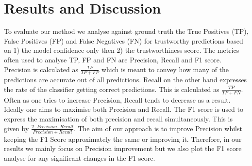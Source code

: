 \section{Results and Discussion} \label{sec:results}
To evaluate our method we analyse against ground truth the True Positives (TP), False Positives (FP) and False Negatives (FN) for trustworthy predictions based on 1) the model confidence only then 2) the trustworthiness score.  
%
The metrics often used to analyse TP, FP and FN are Precision, Recall and F1 score. Precision is calculated as $\frac{TP}{TP+FP}$  which is meant to convey how many of the predictions are accurate out of all predictions. Recall on the other hand expresses the rate of the classifier getting correct predictions. This is calculated as $\frac{TP}{TP+FN}$. Often as one tries to increase Precision, Recall tends to decrease as a result. Ideally one aims to maximise both Precision and Recall. The F1 score is used to express the maximisation of both precision and recall simultaneously. This is given by $\frac{2\cdot Precision\cdot Recall}{Precision + Recall}$.
%
The aim of our approach is to improve Precision whilst keeping the F1 Score approximately the same or improving it. 
%
Therefore, in our results we mainly focus on Precision improvement but we also plot the F1 score analyse for any significant changes in the F1 score. 
%


